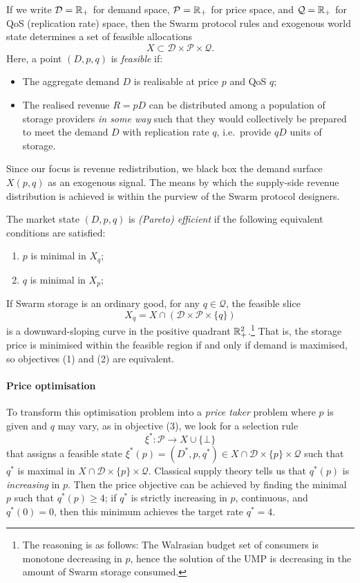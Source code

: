 If we write $\mathcal{D}=\mathbb{R}_+$ for demand space, $\mathcal{P}=\mathbb{R}_+$ for price space, and $\mathcal{Q}=\mathbb{R}_+$ for QoS (replication rate) space, then the Swarm protocol rules and exogenous world state determines a set of feasible allocations
%
\[
  X \subset \mathcal{D}\times\mathcal{P}\times\mathcal{Q}.
\]
%
Here, a point $(D,p,q)$ is \emph{feasible} if:
\begin{itemize}
  \item The aggregate demand $D$ is realisable at price $p$ and QoS $q$;
  \item The realised revenue $R=pD$ can be distributed among a population of storage providers \emph{in some way} such that they would collectively be prepared to meet the demand $D$ with replication rate $q$, i.e.~provide $qD$ units of storage.
\end{itemize}
%
Since our focus is revenue redistribution, we black box the demand surface $X(p,q)$ as an exogenous signal.
%
The means by which the supply-side revenue distribution is achieved is within the purview of the Swarm protocol designers.

\begin{definition}

  The market state $(D,p,q)$ is \emph{(Pareto) efficient} if the following equivalent conditions are satisfied:
  \begin{enumerate}
    \item $p$ is minimal in $X_q$;
    \item $q$ is minimal in $X_p$;
  \end{enumerate}

\end{definition}

If Swarm storage is an ordinary good, for any $q\in \mathcal{Q}$, the feasible slice 
\[
  X_q = X \cap (\mathcal{D}\times\mathcal{P}\times\{q\})
\]
is a downward-sloping curve in the positive quadrant $\mathbb{R}_+^2$.\footnote{The reasoning is as follows: The Walrasian budget set of consumers is monotone decreasing in $p$, hence the solution of the UMP is decreasing in the amount of Swarm storage consumed.}
%
That is, the storage price is minimised within the feasible region if and only if demand is maximised, so objectives (1) and (2) are equivalent.

\paragraph{Price optimisation}
To transform this optimisation problem into a \emph{price taker} problem where $p$ is given and $q$ may vary, as in objective (3), we look for a selection rule 
\[
  \xi^*:\mathcal{P}\rightarrow X\cup\{\bot\}
\]
that assigns a feasible state $\xi^*(p)=(D^*,p,q^*)\in X\cap \mathcal{D}\times\{p\}\times\mathcal{Q}$ such that $q^*$ is maximal in $X\cap \mathcal{D}\times\{p\}\times\mathcal{Q}$.
%
Classical supply theory tells us that $q^*(p)$ is \emph{increasing} in $p$. 
%
Then the price objective can be achieved by finding the minimal $p$ such that $q^*(p)\geq 4$; if $q^*$ is strictly increasing in $p$, continuous, and $q^*(0)=0$, then this minimum achieves the target rate $q^*=4$.


